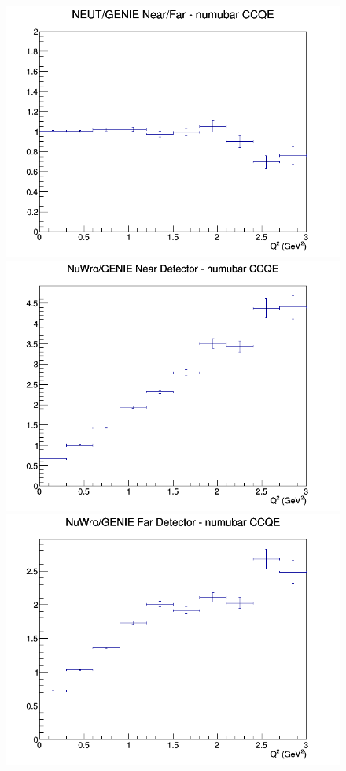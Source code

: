 \documentclass[12pt]{article}
\begin{document}
\begin{figure}[h]
\endminipage
{}
\includegraphics[width=\linewidth]{Q2/nominal/ratios/CCQE_NEUT_GENIE_numubar_NF_Q2.png}
\endminipage
\newline
{}
\includegraphics[width=\linewidth]{Q2/nominal/ratios/CCQE_NuWro_GENIE_numubar_near_Q2.png}
\endminipage
{}
\includegraphics[width=\linewidth]{Q2/nominal/ratios/CCQE_NuWro_GENIE_numubar_far_Q2.png}

\end{figure}
\end{document}
